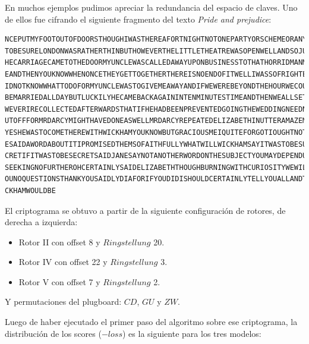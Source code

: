 \documentclass[a4paper,10pt]{article}
\begin{document}
En muchos ejemplos pudimos apreciar la redundancia del espacio de claves. Uno de ellos fue cifrando el siguiente fragmento del texto \textit{Pride and prejudice}:
\begin{small}
\begin{Verbatim}
NCEPUTMYFOOTOUTOFDOORSTHOUGHIWASTHEREAFORTNIGHTNOTONEPARTYORSCHEMEORANYTHING
TOBESURELONDONWASRATHERTHINBUTHOWEVERTHELITTLETHEATREWASOPENWELLANDSOJUSTAST
HECARRIAGECAMETOTHEDOORMYUNCLEWASCALLEDAWAYUPONBUSINESSTOTHATHORRIDMANMRSTON
EANDTHENYOUKNOWWHENONCETHEYGETTOGETHERTHEREISNOENDOFITWELLIWASSOFRIGHTENEDID
IDNOTKNOWWHATTODOFORMYUNCLEWASTOGIVEMEAWAYANDIFWEWEREBEYONDTHEHOURWECOULDNOT
BEMARRIEDALLDAYBUTLUCKILYHECAMEBACKAGAININTENMINUTESTIMEANDTHENWEALLSETOUTHO
WEVERIRECOLLECTEDAFTERWARDSTHATIFHEHADBEENPREVENTEDGOINGTHEWEDDINGNEEDNOTBEP
UTOFFFORMRDARCYMIGHTHAVEDONEASWELLMRDARCYREPEATEDELIZABETHINUTTERAMAZEMENTOH
YESHEWASTOCOMETHEREWITHWICKHAMYOUKNOWBUTGRACIOUSMEIQUITEFORGOTIOUGHTNOTTOHAV
ESAIDAWORDABOUTITIPROMISEDTHEMSOFAITHFULLYWHATWILLWICKHAMSAYITWASTOBESUCHASE
CRETIFITWASTOBESECRETSAIDJANESAYNOTANOTHERWORDONTHESUBJECTYOUMAYDEPENDUPONMY
SEEKINGNOFURTHEROHCERTAINLYSAIDELIZABETHTHOUGHBURNINGWITHCURIOSITYWEWILLASKY
OUNOQUESTIONSTHANKYOUSAIDLYDIAFORIFYOUDIDISHOULDCERTAINLYTELLYOUALLANDTHENWI
CKHAMWOULDBE
\end{Verbatim}
\end{small}

El criptograma se obtuvo a partir de la siguiente configuración de rotores, de derecha a izquierda:

\begin{itemize}
  \item Rotor II con offset 8 y $Ringstellung$ 20.
  \item Rotor IV con offset 22 y $Ringstellung$ 3.
  \item Rotor V con offset 7 y $Ringstellung$ 2.
\end{itemize}

Y permutaciones del plugboard: $CD$, $GU$ y $ZW$.

Luego de haber ejecutado el primer paso del algoritmo sobre ese criptograma, la distribución de los scores ($-{loss}$) es la siguiente para los tres modelos:
\end{document}

